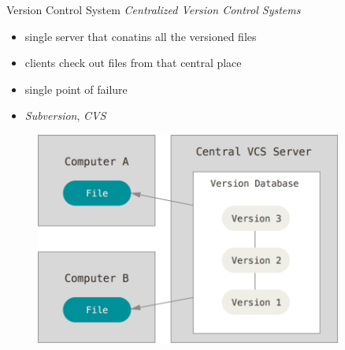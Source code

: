 \begin{frame}[fragile]{Version Control System}
    \emph{Centralized Version Control Systems}
    \vspace{1cm}

    \begin{minipage}{0.49\textwidth}
        \begin{itemize}
            \item single server that conatins all the versioned files
            \item clients check out files from that central place
            \item single point of failure
            \item \emph{Subversion}, \emph{CVS}
        \end{itemize}
    \end{minipage}
    \begin{minipage}{0.49\textwidth}
        \begin{figure}
            \centering
            \includegraphics[width=0.9\textwidth]{img/centralized_vcs.png}
        \end{figure}
    \end{minipage}

\end{frame}

